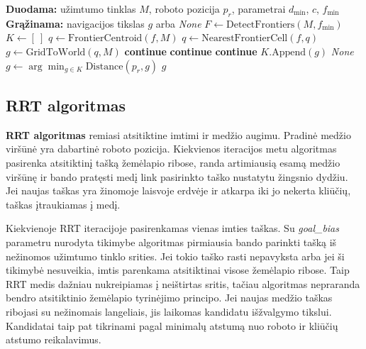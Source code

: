 \documentclass[]{VUMIFTemplateClass}
\begin{document}
\begin{algorithm}[H]
\caption{Artimiausios ribos algoritmas}
\begin{algorithmic}[1]
\STATE \textbf{Duodama:} užimtumo tinklas $M$, roboto pozicija $p_r$, parametrai $d_{\min}$, $c$, $f_{\min}$
\STATE \textbf{Grąžinama:} navigacijos tikslas $g$ arba \textit{None}
\STATE $F \leftarrow \mathrm{DetectFrontiers}(M,f_{\min})$
\STATE $K \leftarrow [\ ]$
  \STATE $q \leftarrow \mathrm{FrontierCentroid}(f,M)$
    \STATE $q \leftarrow \mathrm{NearestFrontierCell}(f,q)$
  \ENDIF
  \STATE $g \leftarrow \mathrm{GridToWorld}(q,M)$
    \STATE \textbf{continue}
  \ENDIF
    \STATE \textbf{continue}
  \ENDIF
    \STATE \textbf{continue}
  \ENDIF
  \STATE $K.\mathrm{Append}(g)$
\ENDFOR
{}
  \RETURN \textit{None}
\ENDIF
\STATE $g \leftarrow \arg\min_{g \in K} \mathrm{Distance}(p_r,g)$
\RETURN $g$
\end{algorithmic}
\end{algorithm}

\subsection{RRT algoritmas}

\textbf{RRT algoritmas} remiasi atsitiktine imtimi ir medžio augimu. Pradinė medžio viršūnė yra dabartinė roboto pozicija. Kiekvienos iteracijos metu algoritmas
pasirenka atsitiktinį tašką žemėlapio ribose, randa artimiausią esamą medžio viršūnę ir bando pratęsti medį link pasirinkto taško nustatytu žingsnio dydžiu.
Jei naujas taškas yra žinomoje laisvoje erdvėje ir atkarpa iki jo nekerta kliūčių, taškas įtraukiamas į medį.

Kiekvienoje RRT iteracijoje pasirenkamas vienas imties taškas. Su \textit{goal\_bias} parametru nurodyta tikimybe algoritmas pirmiausia bando parinkti tašką iš
nežinomos užimtumo tinklo srities. Jei tokio taško rasti nepavyksta arba jei ši tikimybė nesuveikia, imtis parenkama atsitiktinai visose žemėlapio ribose. Taip
RRT medis dažniau nukreipiamas į neištirtas sritis, tačiau algoritmas nepraranda bendro atsitiktinio žemėlapio tyrinėjimo principo. Jei naujas medžio taškas
ribojasi su nežinomais langeliais, jis laikomas kandidatu išžvalgymo tikslui. Kandidatai taip pat tikrinami pagal minimalų atstumą nuo roboto ir kliūčių
atstumo reikalavimus.
\end{document}
